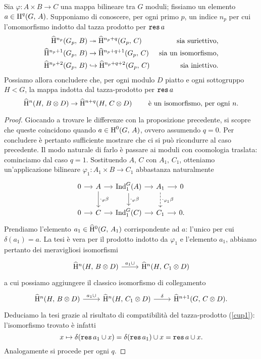 \begin{proposition}
	Sia $ \varphi \colon A \times B \to C $ una mappa bilineare tra $ G $ moduli; fissiamo un elemento $ a \in \operatorname{H}^q(G, \, A) $. Supponiamo di conoscere, per ogni primo $ p $, un indice $ n_p $ per cui l'omomorfismo indotto dal tazza prodotto per $ \operatorname{\mathtt{res}} a $
	\begin{align*}
	\operatorname{\widehat{H}^{\mathnormal{n_p}}}(G_p,\, B) &\twoheadrightarrow \operatorname{\widehat{H}^{\mathnormal{n_p}+\mathnormal{q}}}(G_p,\, C) & \text{ sia suriettivo,} \\
	\operatorname{\widehat{H}^{\mathnormal{n_p}+1}}(G_p,\, B) &\to \operatorname{\widehat{H}^{\mathnormal{n_p}+\mathnormal{q}+1}}(G_p,\, C) & \text{ sia un isomorfismo,} \\
	\operatorname{\widehat{H}^{\mathnormal{n_p}+2}}(G_p,\, B) &\hookrightarrow \operatorname{\widehat{H}^{\mathnormal{n_p}+\mathnormal{q}+2}}(G_p,\, C) & \text{ sia iniettivo.}
	\end{align*}
	Possiamo allora concludere che, per ogni modulo $ D $ piatto e ogni sottogruppo $ H < G $, la mappa indotta dal tazza-prodotto per $ \operatorname{\mathtt{res}} a $
	\[ \operatorname{\widehat{H}^{\mathnormal{n}}}(H, \, B \otimes D) \to \operatorname{\widehat{H}^{\mathnormal{n}+\mathnormal{q}}}(H, \,  C\otimes D) \qquad\text{ è un isomorfismo, per ogni } n. \]
\end{proposition}

\begin{proof}
	Giocando a trovare le differenze con la proposizione precedente, si scopre che queste coincidono quando $ a \in \operatorname{H}^0(G, \, A) $, ovvero assumendo $ q = 0. $ Per concludere è pertanto sufficiente mostrare che ci si può ricondurre al caso precedente. Il modo naturale di farlo è passare ai moduli con coomologia traslata: cominciamo dal caso $ q = 1 $. Sostituendo $ A, \, C $ con $ A_1 ,\,  C_1 $, otteniamo un'applicazione bilineare $ \varphi_1\colon A_1 \times B \to C_1 $ abbastanza naturalmente
	\[ \begin{tikzcd}[column sep = small]
	0 \rar
	& A \rar \dar["\cdot_\varphi\beta"]
	& \Ind_1^G(A) \rar \dar["\cdot_\varphi\beta"]
	& A_1 \rar \dar["\cdot_{\varphi_1}\beta", dashed]
	& 0\\
	0 \rar & C \rar & \Ind_1^G(C) \rar & C_1 \rar & 0.  \end{tikzcd} \]
	Prendiamo l'elemento $ a_1 \in \operatorname{\widehat{H}^{0}}(G, \, A_1) $ corrispondente ad $ a $: l'unico per cui $ \delta(a_1) = a $. La tesi è vera per il prodotto indotto da $ \varphi_1 $ e l'elemento $ a_1 $, abbiamo pertanto dei meravigliosi isomorfismi
	\[ \begin{tikzcd}
	\Hhn(H, \, B \otimes D) \rar["a_1\cup"] & \Hhn(H, \,  C_1 \otimes D)
	\end{tikzcd}  \]
	a cui possiamo aggiungere il classico isomorfismo di collegamento
	\[ \begin{tikzcd}
	\Hhn(H, \, B \otimes D) \rar["a_1\cup"] & \Hhn(H, \,  C_1 \otimes D) \rar["\delta"] & \Hhnu(G, \, C \otimes D).
	\end{tikzcd}  \]
	Deduciamo la tesi grazie al risultato di compatibilità del tazza-prodotto (\ref{cup1}): l'isomorfismo trovato è infatti $$  x \mapsto \delta(\operatorname{\mathtt{res}} a_1 \cup x) = \delta(\operatorname{\mathtt{res}} a_1) \cup x = \operatorname{\mathtt{res}} a \cup x.  $$ Analogamente si procede per ogni $ q $.
\end{proof}

